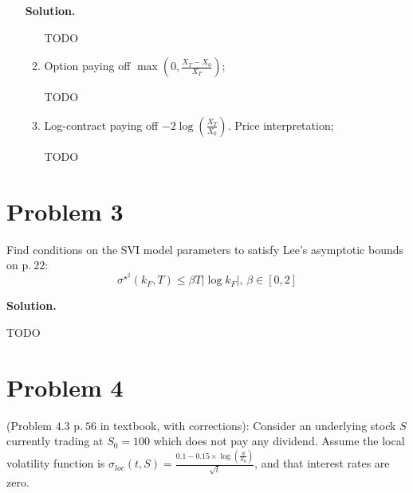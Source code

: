 \documentclass[12pt]{article}
\newenvironment{solution}{\vspace{0.2cm} \textbf{Solution.}}{}
\begin{document}
\begin{enumerate}[label=(\alph*)]
\begin{solution}
\begin{enumerate}[label=(\roman*)]
				TODO

				\item Option paying off $\max\left(0, \frac{X_T- X_0}{X_T}\right)$;

				TODO

				\item Log-contract paying off $-2\log\left(\frac{X_T}{X_0}\right)$. Price interpretation;

				TODO

			\end{enumerate}

		\end{solution}

	\end{enumerate}

\newpage

\section*{Problem 3}
Find conditions on the SVI model parameters to satisfy Lee’s asymptotic bounds on p$.\ 22$: 
$$\sigma^{\star^2} (k_F,T) \leq \beta T |\log{k_F}|,\, \beta \in [0,2]$$

	\begin{solution}

	TODO

	\end{solution}

\newpage

\section*{Problem 4}
(Problem $4.3$ p$.\ 56$ in textbook, with corrections): Consider an underlying stock $S$ currently trading at $S_0 = 100$ which does not pay any dividend. Assume the local volatility function is $\sigma_{loc} (t, S) = \frac{0.1 - 0.15 \times \log\left(\frac{S}{S_0}\right)}{\sqrt{t}}$, and that interest rates are zero.
\end{document}
